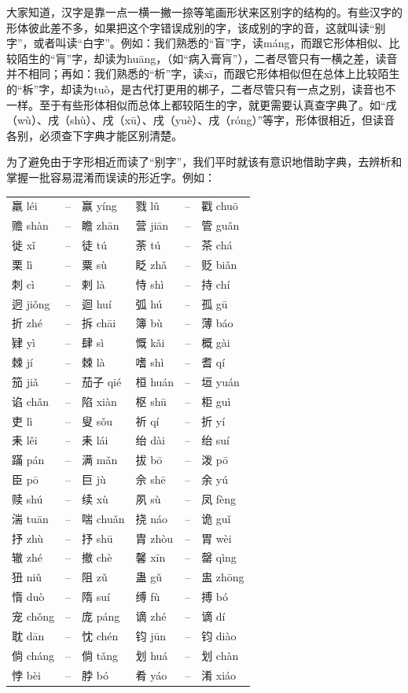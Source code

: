 大家知道，汉字是靠一点一横一撇一捺等笔画形状来区别字的结构的。有些汉字的形体彼此差不多，如果把这个字错误成别的字，该成别的字的音，这就叫读“别字”，或者叫读“白字”。例如：我们熟悉的“盲”字，读máng，而跟它形体相似、比较陌生的“肓”字，却读为huāng，（如“病入膏肓”），二者尽管只有一横之差，读音并不相同；再如：我们熟悉的“析”字，读xī，而跟它形体相似但在总体上比较陌生的“柝”字，却读为tuò，是古代打更用的梆子，二者尽管只有一点之别，读音也不一样。至于有些形体相似而总体上都较陌生的字，就更需要认真查字典了。如“戌（wù）、戌（shù）、戌（xū）、戌（yuè）、戌（róng）”等字，形体很相近，但读音各别，必须查下字典才能区别清楚。

为了避免由于字形相近而读了“别字”，我们平时就该有意识地借助字典，去辨析和掌握一批容易混淆而误读的形近字。例如：

\noindent
\begin{tabular}{llllll}
    羸 léi & -- & 赢 yíng & 戮 lǔ & -- & 戳 chuō\\
    赡 shàn & -- & 瞻 zhān & 营 jiān & -- & 管 guǎn\\
    徙 xǐ & -- & 徒 tú & 荼 tú & -- & 茶 chá\\
    栗 lì & -- & 粟 sù & 眨 zhǎ & -- & 贬 biǎn\\
    刺 cì & -- & 剌 là & 恃 shì & -- & 持 chí\\
    迥 jiǒng & -- & 迴 huí & 弧 hú & -- & 孤 gū\\
    折 zhé & -- & 拆 chāi & 簿 bù & -- & 薄 báo\\
    肄 yì & -- & 肆 sì & 慨 kǎi & -- & 概 gài\\
    棘 jí & -- & 棘 là & 嗜 shì & -- & 耆 qí\\
    笳 jiǎ & -- & 茄子 qié & 桓 huán & -- & 垣 yuán\\
    谄 chǎn & -- & 陷 xiàn & 枢 shū & -- & 柜 guì\\
    吏 lì & -- & 叟 sǒu & 祈 qí & -- & 折 yí\\
    耒 lěi & -- & 耒 lái & 绐 dài & -- & 绐 suí\\
    蹣 pán & -- & 满 mǎn & 拔 bō & -- & 泼 pō\\
    臣 pō & -- & 巨 jù & 佘 shē & -- & 余 yú\\
    赎 shú & -- & 续 xù & 夙 sù & -- & 凤 fèng\\
    湍 tuān & -- & 喘 chuǎn & 挠 náo & -- & 诡 guǐ\\
    抒 zhù & -- & 抒 shū & 胄 zhòu & -- & 胃 wèi\\
    辙 zhé & -- & 撤 chè & 馨 xīn & -- & 罄 qìng\\
    狃 niǔ & -- & 阻 zǔ & 蛊 gǔ & -- & 盅 zhōng\\
    惰 duò & -- & 隋 suí & 缚 fù & -- & 搏 bó\\
    宠 chǒng & -- & 庞 páng & 谪 zhé & -- & 谪 dí\\
    耽 dān & -- & 忱 chén & 钧 jūn & -- & 钧 diào\\
    倘 cháng & -- & 倘 tǎng & 划 huá & -- & 划 chàn\\
    悖 bèi & -- & 脖 bó & 肴 yáo & -- & 淆 xiáo\\
\end{tabular}

